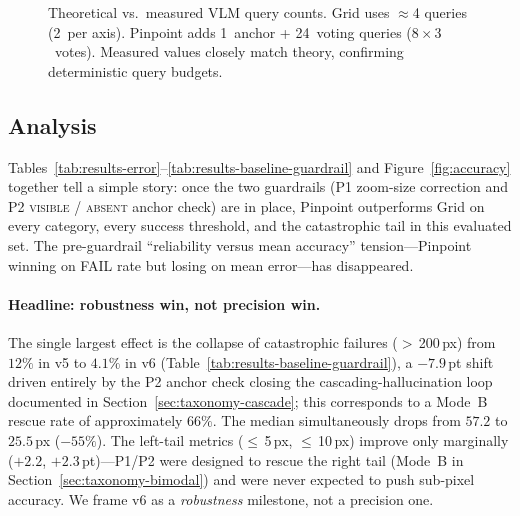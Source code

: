 \documentclass[sigconf,nonacm]{acmart}
\begin{document}
\begin{figure}[t]
  \centering
  
  \caption{Theoretical vs.\ measured VLM query counts. Grid uses
    $\approx$4 queries (2~per axis). Pinpoint adds 1~anchor + 24~voting
    queries ($8 \times 3$~votes). Measured values closely match theory,
    confirming deterministic query budgets.
  }
  \label{fig:query-cost}
\end{figure}

\subsection{Analysis}

Tables~\ref{tab:results-error}--\ref{tab:results-baseline-guardrail} and
Figure~\ref{fig:accuracy} together tell a simple story: once the two
guardrails (P1 zoom-size correction and P2 \textsc{visible} /
\textsc{absent} anchor check) are in place, Pinpoint outperforms
Grid on every category, every success threshold, and the catastrophic
tail in this evaluated set.  The pre-guardrail
``reliability versus mean accuracy'' tension---Pinpoint
winning on FAIL rate but losing on mean error---has disappeared.

\paragraph{Headline: robustness win, not precision win.}
The single largest effect is the collapse of catastrophic failures
($>$\,200\,px) from $12\%$ in v5 to $4.1\%$ in v6
(Table~\ref{tab:results-baseline-guardrail}), a $-7.9$\,pt shift driven entirely
by the P2 anchor check closing the cascading-hallucination loop
documented in Section~\ref{sec:taxonomy-cascade}; this corresponds
to a Mode~B rescue rate of approximately $66\%$.  The median
simultaneously drops from $57.2$ to $25.5$\,px ($-55\%$).  The
left-tail metrics ($\leq$\,5\,px, $\leq$\,10\,px) improve only
marginally ($+2.2$, $+2.3$\,pt)---P1/P2 were designed to rescue the
right tail (Mode~B in Section~\ref{sec:taxonomy-bimodal}) and were
never expected to push sub-pixel accuracy.  We frame v6 as a
\emph{robustness} milestone, not a precision one.
\end{document}
